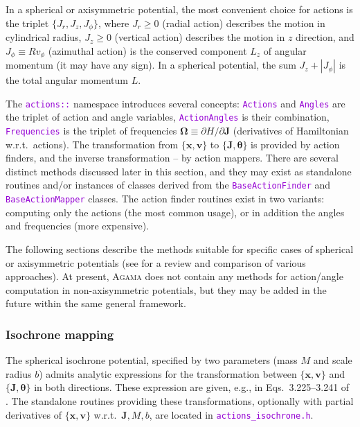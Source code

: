 \documentclass[12pt]{article}
\newcommand{\Agama}{\textsc{Agama}\xspace}
\newcommand{\ttt}[1]{\textcolor{darkviolet}{\texttt{#1}}}
\renewcommand{\d}{\partial}
\newcommand{\bv}{\boldsymbol{v}}
\newcommand{\bx}{\boldsymbol{x}}
\newcommand{\bJ}{\boldsymbol{J}}
\newcommand{\bt}{\boldsymbol{\theta}}
\begin{document}
In a spherical or axisymmetric potential, the most convenient choice for actions is the triplet $\{J_r, J_z, J_\phi\}$, where $J_r\ge 0$ (radial action) describes the motion in cylindrical radius, $J_z\ge 0$ (vertical action) describes the motion in $z$ direction, and $J_\phi \equiv R v_\phi$ (azimuthal action) is the conserved component $L_z$ of angular momentum (it may have any sign). In a spherical potential, the sum $J_z + |J_\phi|$ is the total angular momentum $L$.

The \ttt{actions::} namespace introduces several concepts: \ttt{Actions} and \ttt{Angles} are the triplet of action and angle variables, \ttt{ActionAngles} is their combination, \ttt{Frequencies} is the triplet of frequencies $\boldsymbol{\Omega}\equiv \d H/\d\bJ$ (derivatives of Hamiltonian w.r.t.\ actions). 
The transformation from $\{\bx,\bv\}$ to $\{\bJ,\bt\}$ is provided by action finders, and the inverse transformation -- by action mappers. There are several distinct methods discussed later in this section, and they may exist as standalone routines and/or instances of classes derived from the \ttt{BaseActionFinder} and \ttt{BaseActionMapper} classes. The action finder routines exist in two variants: computing only the actions (the most common usage), or in addition the angles and frequencies (more expensive).

The following sections describe the methods suitable for specific cases of spherical or axisymmetric potentials (see \cite{SandersBinney2016} for a review and comparison of various approaches).
At present, \Agama does not contain any methods for action/angle computation in non\--axi\-sym\-met\-ric potentials, but they may be added in the future within the same general framework.

\subsubsection{Isochrone mapping}  \label{sec:ActionsIsochrone}

The spherical isochrone potential, specified by two parameters (mass $M$ and scale radius $b$) admits analytic expressions for the transformation between $\{\bx,\bv\}$ and $\{\bJ,\bt\}$ in both directions. These expression are given, e.g., in Eqs.~3.225--3.241 of \cite{BinneyTremaine}.
The standalone routines providing these transformations, optionally with partial derivatives of $\{\bx,\bv\}$ w.r.t.\ $\bJ, M, b$, are located in \ttt{actions_isochrone.h}.
\end{document}
